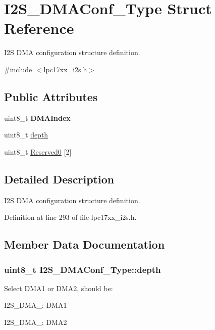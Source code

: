 \hypertarget{struct_i2_s___d_m_a_conf___type}{\section{\-I2\-S\-\_\-\-D\-M\-A\-Conf\-\_\-\-Type \-Struct \-Reference}
\label{struct_i2_s___d_m_a_conf___type}
}


\-I2\-S \-D\-M\-A configuration structure definition.  




{\ttfamily \#include $<$lpc17xx\-\_\-i2s.\-h$>$}

\subsection*{\-Public \-Attributes}
\begin{DoxyCompactItemize}
\item 
\hypertarget{struct_i2_s___d_m_a_conf___type_a7fec1a629a968212ed936b2bcc83ceba}{uint8\-\_\-t {\bfseries \-D\-M\-A\-Index}}\label{struct_i2_s___d_m_a_conf___type_a7fec1a629a968212ed936b2bcc83ceba}

\item 
uint8\-\_\-t \hyperlink{struct_i2_s___d_m_a_conf___type_a8b83a5491254089d02fbf7d53032022c}{depth}
\item 
uint8\-\_\-t \hyperlink{struct_i2_s___d_m_a_conf___type_a096168376e1599d2e2b1992e34ed2faf}{\-Reserved0} \mbox{[}2\mbox{]}
\end{DoxyCompactItemize}


\subsection{\-Detailed \-Description}
\-I2\-S \-D\-M\-A configuration structure definition. 

\-Definition at line 293 of file lpc17xx\-\_\-i2s.\-h.



\subsection{\-Member \-Data \-Documentation}
\hypertarget{struct_i2_s___d_m_a_conf___type_a8b83a5491254089d02fbf7d53032022c}{
\subsubsection[{depth}]{\setlength{\rightskip}{0pt plus 5cm}uint8\-\_\-t {\bf \-I2\-S\-\_\-\-D\-M\-A\-Conf\-\_\-\-Type\-::depth}}}\label{struct_i2_s___d_m_a_conf___type_a8b83a5491254089d02fbf7d53032022c}
\-Select \-D\-M\-A1 or \-D\-M\-A2, should be\-:
\begin{DoxyItemize}
\item \-I2\-S\-\_\-\-D\-M\-A\-\_\-: \-D\-M\-A1
\item \-I2\-S\-\_\-\-D\-M\-A\-\_\-: \-D\-M\-A2 
\end{DoxyItemize}

